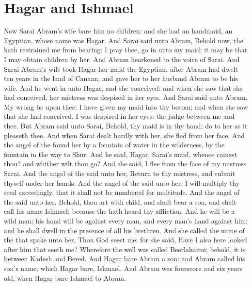 \section*{Hagar and Ishmael}
\begin{biblechapter} %
\verse Now Sarai Abram's wife bare him no children: and she had an handmaid, an Egyptian, whose name was Hagar.
\verse And Sarai said unto Abram, Behold now, the \LORD hath restrained me from bearing: I pray thee, go in unto my maid; it may be that I may obtain children by her. And Abram hearkened to the voice of Sarai.
\verse And Sarai Abram's wife took Hagar her maid the Egyptian, after Abram had dwelt ten years in the land of Canaan, and gave her to her husband Abram to be his wife.
\verse And he went in unto Hagar, and she conceived: and when she saw that she had conceived, her mistress was despised in her eyes.
\verse And Sarai said unto Abram, My wrong be upon thee: I have given my maid into thy bosom; and when she saw that she had conceived, I was despised in her eyes: the \LORD judge between me and thee.
\verse But Abram said unto Sarai, Behold, thy maid is in thy hand; do to her as it pleaseth thee. And when Sarai dealt hardly with her, she fled from her face.
\verse And the angel of the \LORD found her by a fountain of water in the wilderness, by the fountain in the way to Shur.
\verse And he said, Hagar, Sarai's maid, whence camest thou? and whither wilt thou go? And she said, I flee from the face of my mistress Sarai.
\verse And the angel of the \LORD said unto her, Return to thy mistress, and submit thyself under her hands.
\verse And the angel of the \LORD said unto her, I will multiply thy seed exceedingly, that it shall not be numbered for multitude.
\verse And the angel of the \LORD said unto her, Behold, thou art with child, and shalt bear a son, and shalt call his name Ishmael; because the \LORD hath heard thy affliction.
\verse And he will be a wild man; his hand will be against every man, and every man's hand against him; and he shall dwell in the presence of all his brethren.
\verse And she called the name of the \LORD that spake unto her, Thou God seest me: for she said, Have I also here looked after him that seeth me?
\verse Wherefore the well was called Beerlahairoi; behold, it is between Kadesh and Bered.
\verse And Hagar bare Abram a son: and Abram called his son's name, which Hagar bare, Ishmael.
\verse And Abram was fourscore and six years old, when Hagar bare Ishmael to Abram.
\end{biblechapter}

